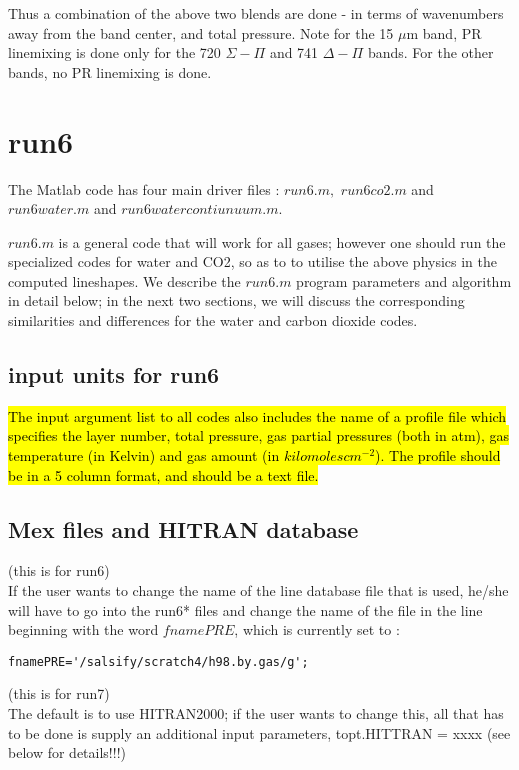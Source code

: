 \documentclass[11pt]{article}
\begin{document}
Thus a combination of the above two blends are done - in terms of 
wavenumbers away from the band center, and total pressure. 
Note for the 15 $\mu$m band, PR linemixing is done only for the 720 
$\Sigma-\Pi$ and 741 $\Delta-\Pi$ bands. For the other bands, no PR linemixing
is done.

\newpage
\section{run6}

The Matlab code has four main driver files : $run6.m,$ $run6co2.m$ and
$run6water.m$ and $run6watercontiunuum.m.$ 

$run6.m$ is a general code that will work for all gases; however 
one should run the specialized codes for water and CO2, so as to to utilise 
the above physics in the computed lineshapes. We describe the $run6.m$ 
program parameters and algorithm in detail below; in the next two sections, 
we will discuss the corresponding similarities and differences for the 
water and carbon dioxide codes.

\subsection{input units for run6}
\hl{The input argument list to all codes also includes the name of a profile file 
which specifies the layer number, total pressure, gas partial 
pressures (both in atm), gas temperature (in Kelvin) and gas amount 
(in $kilomoles cm^{-2}$). The profile should be in a 5 column format, 
and should be a text file.}

\subsection{Mex files and HITRAN database}
(this is for run6) \\
If the user wants to change the name of the line database file that is used,
he/she will have to go into the run6* files and change the name of the 
file in the line beginning with the word $fnamePRE$, which is currently 
set to :
\begin{verbatim}
fnamePRE='/salsify/scratch4/h98.by.gas/g';
\end{verbatim}

(this is for run7) \\
The default is to use HITRAN2000; if the user wants to change this, all that
has to be done is supply an additional input parameters, topt.HITTRAN = xxxx
(see below for details!!!)
\end{document}
